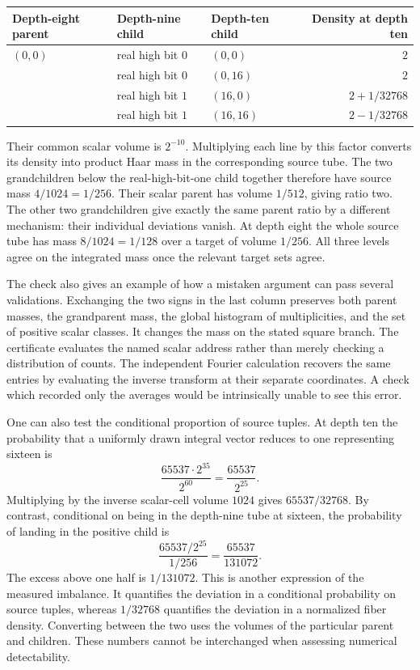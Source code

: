 \documentclass[12pt,letterpaper]{article}
\begin{document}
\begin{center}\small
\begin{tabular}{@{}lllr@{}}\toprule
Depth-eight parent&Depth-nine child&Depth-ten child&Density at depth ten\\\midrule
$(0,0)$&real high bit $0$&$(0,0)$&$2$\\
&real high bit $0$&$(0,16)$&$2$\\[2pt]
&real high bit $1$&$(16,0)$&$2+1/32768$\\
&real high bit $1$&$(16,16)$&$2-1/32768$\\\bottomrule
\end{tabular}
\end{center}
Their common scalar volume is $2^{-10}$. Multiplying each line by this factor converts its density into product Haar mass in the corresponding source tube. The two grandchildren below the real-high-bit-one child together therefore have source mass $4/1024=1/256$. Their scalar parent has volume $1/512$, giving ratio two. The other two grandchildren give exactly the same parent ratio by a different mechanism: their individual deviations vanish. At depth eight the whole source tube has mass $8/1024=1/128$ over a target of volume $1/256$. All three levels agree on the integrated mass once the relevant target sets agree.

The check also gives an example of how a mistaken argument can pass several validations. Exchanging the two signs in the last column preserves both parent masses, the grandparent mass, the global histogram of multiplicities, and the set of positive scalar classes. It changes the mass on the stated square branch. The certificate evaluates the named scalar address rather than merely checking a distribution of counts. The independent Fourier calculation recovers the same entries by evaluating the inverse transform at their separate coordinates. A check which recorded only the averages would be intrinsically unable to see this error.

One can also test the conditional proportion of source tuples. At depth ten the probability that a uniformly drawn integral vector reduces to one representing sixteen is
\[
      \frac{65537\cdot2^{35}}{2^{60}}=\frac{65537}{2^{25}}.
\]
Multiplying by the inverse scalar-cell volume $1024$ gives $65537/32768$. By contrast, conditional on being in the depth-nine tube at sixteen, the probability of landing in the positive child is
\[
     \frac{65537/2^{25}}{1/256}=\frac{65537}{131072}.
\]
The excess above one half is $1/131072$. This is another expression of the measured imbalance. It quantifies the deviation in a conditional probability on source tuples, whereas $1/32768$ quantifies the deviation in a normalized fiber density. Converting between the two uses the volumes of the particular parent and children. These numbers cannot be interchanged when assessing numerical detectability.
\end{document}
